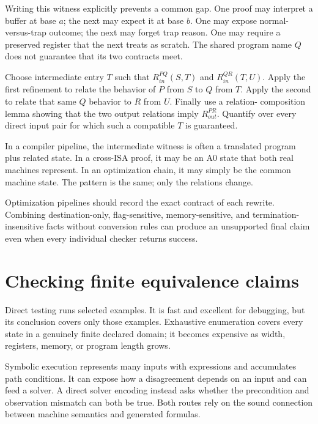 Writing this witness explicitly prevents a common gap. One proof may interpret
a buffer at base \(a\); the next may expect it at base \(b\). One may expose
normal-versus-trap outcome; the next may forget trap reason. One may require a
preserved register that the next treats as scratch. The shared program name
\(Q\) does not guarantee that its two contracts meet.

\begin{proofkit}[title={Relational composition pattern}]
Choose intermediate entry \(T\) such that
\(R_{in}^{PQ}(S,T)\) and \(R_{in}^{QR}(T,U)\). Apply the first refinement to
relate the behavior of \(P\) from \(S\) to \(Q\) from \(T\). Apply the second
to relate that same \(Q\) behavior to \(R\) from \(U\). Finally use a relation-
composition lemma showing that the two output relations imply
\(R_{out}^{PR}\). Quantify over every direct input pair for which such a
compatible \(T\) is guaranteed.
\end{proofkit}

In a compiler pipeline, the intermediate witness is often a translated program
plus related state. In a cross-ISA proof, it may be an A0 state that both real
machines represent. In an optimization chain, it may simply be the common
machine state. The pattern is the same; only the relations change.

Optimization pipelines should record the exact contract of each rewrite.
Combining destination-only, flag-sensitive, memory-sensitive, and
termination-insensitive facts without conversion rules can produce an
unsupported final claim even when every individual checker returns success.

\section{Checking finite equivalence claims}

Direct testing runs selected examples. It is fast and excellent for debugging,
but its conclusion covers only those examples. Exhaustive enumeration covers
every state in a genuinely finite declared domain; it becomes expensive as
width, registers, memory, or program length grows.

Symbolic execution represents many inputs with expressions and accumulates
path conditions. It can expose how a disagreement depends on an input and can
feed a solver. A direct solver encoding instead asks whether the precondition
and observation mismatch can both be true. Both routes rely on the
sound connection between machine semantics and generated formulas.

